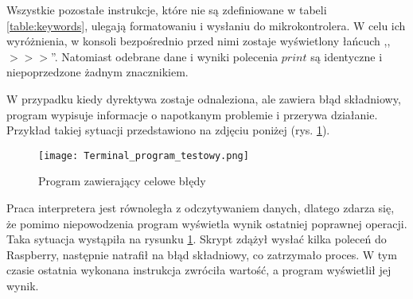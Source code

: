             Wszystkie pozostałe instrukcje, które nie są zdefiniowane w tabeli \ref{table:keywords}, ulegają formatowaniu i wysłaniu do mikrokontrolera.
            W celu ich wyróżnienia, w konsoli bezpośrednio przed nimi zostaje wyświetlony łańcuch ,,$>>>$''.
            Natomiast odebrane dane i wyniki polecenia $print$ są identyczne i niepoprzedzone żadnym znacznikiem.

            W przypadku kiedy dyrektywa zostaje odnaleziona, ale zawiera błąd składniowy, program wypisuje informacje o napotkanym problemie i przerywa działanie.
            Przykład takiej sytuacji przedstawiono na zdjęciu poniżej (rys. \ref{fig:interpreter}).

            \begin{figure}[!ht]
                \centering
                \texttt{[image: Terminal\_program\_testowy.png]}
                \caption{Program zawierający celowe błędy}
                \label{fig:interpreter}
            \end{figure}

            Praca interpretera jest równoległa z odczytywaniem danych, dlatego zdarza się, że pomimo niepowodzenia program wyświetla wynik ostatniej poprawnej operacji.
            Taka sytuacja wystąpiła na rysunku \ref{fig:interpreter}. Skrypt zdążył wysłać kilka poleceń do Raspberry, następnie natrafił na błąd składniowy, co zatrzymało proces.
            W tym czasie ostatnia wykonana instrukcja zwróciła wartość, a program wyświetlił jej wynik.

\newpage
\